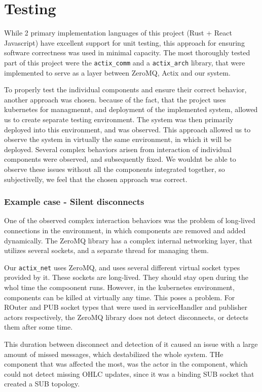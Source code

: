 \section{Testing}
While 2 primary implementation languages of this project (Rust + React Javascript) have excellent support for unit testing,
this approach for ensuring software correctness was used in minimal capacity. The most thoroughly tested part of this project
were the \verb|actix_comm| and a \verb|actix_arch| library, that were implemented to serve as a layer between ZeroMQ, Actix
and our system.

To properly test the individual components and ensure their correct behavior, another approach was chosen. because of the
fact, that the project uses kubernetes for managmennt, and deployment of the implemented system, allowed us to create
separate testing environment. The system was then primarily deployed into this environment, and was observed.
This approach allowed us to observe the system in virtually the same environment, in which it will be deployed.
Several complex behaviors arisen from interaction of individual components were observed, and subsequently fixed.
We wouldnt be able to observe these issues without all the components integrated together, so subjectivelly, we
feel that the chosen approach was correct.

\subsubsection{Example case - Silent disconnects}
One of the observed complex interaction behaviors was the problem of long-lived connections in the environment, in
which components are removed and added dynamically.
The ZeroMQ library has a complex internal networking layer, that utilizes several sockets, and a separate thread
for managing them.

Our \verb|actix_net| uses ZeroMQ, and uses several different virtual socket types provided by it. These sockets
are long-lived. They should stay open during the whol time the compoonent runs. However, in the kubernetes environment,
components can be killed at virtually any time. This poses a problem. For ROuter and PUB socket types that were
used in serviceHandler and publisher actors respectively, the ZeroMQ library does not detect disconnects, or detects
them after some time.

This duration between disconnect and detection of it caused an issue with a large amount of missed messages, which
destabilized the whole system. THe component that was affected the most, was the  actor in the 
component, which could not detect missing OHLC updates, since it was a binding SUB socket that created a SUB topology.

